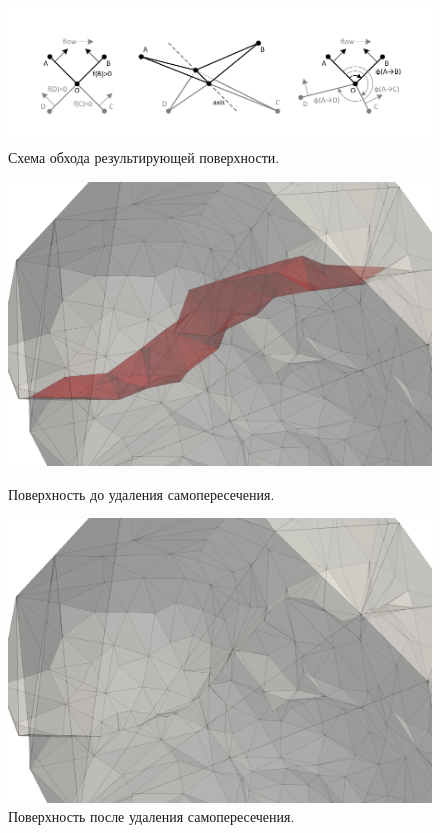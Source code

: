 \begin{figure}[h]
\includegraphics[width=1.0\textwidth]{pics/pic_walk_1_size.pdf}
\caption{Схема обхода результирующей поверхности.}\label{fig:pic_walk}
\end{figure}

\begin{figure}[h]
  \centering
  \begin{minipage}[h]{0.49\textwidth}
    \includegraphics[width=\textwidth]{pics/pic_self_intersection_on.png}
    \caption{Поверхность до удаления самопересечения.}\label{fig:pic_self_intersection_on}
  \end{minipage}
  \hfill
  \begin{minipage}[h]{0.49\textwidth}
    \includegraphics[width=\textwidth]{pics/pic_self_intersection_off.png}
    \caption{Поверхность после удаления самопересечения.}\label{fig:pic_self_intersection_off}
  \end{minipage}
\end{figure}

